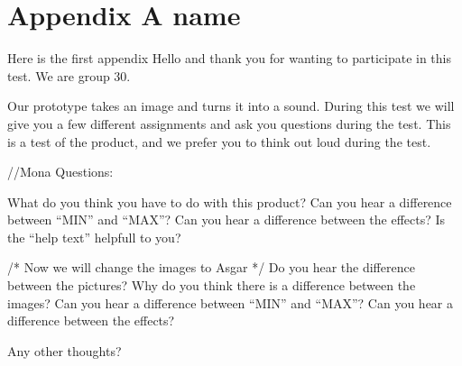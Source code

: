 \chapter{Appendix A name}\label{ch:appAlabel}
Here is the first appendix
Hello and thank you for wanting to participate in this test. We are group 30.

Our prototype takes an image and turns it into a sound. During this test we will give you a few different assignments and ask you questions during the test. This is a test of the product, and we prefer you to think out loud during the test.

//Mona
Questions: 

What do you think you have to do with this product?
Can you hear a difference between “MIN” and “MAX”?
Can you hear a difference between the effects?
Is the “help text” helpfull to you?

/* Now we will change the images to Asgar */
Do you hear the difference between the pictures?
Why do you think there is a difference between the images?
Can you hear a difference between “MIN” and “MAX”?
Can you hear a difference between the effects?

Any other thoughts?
